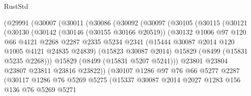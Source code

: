 \begin{lexlean}{RustStd}
\begin{coremodule}
                  (@29991
                    (@30007
                      (@30011
                        (@30086
                          (@30092
                            (@30097
                              (@30105
                                (@30115
                                  (@30121
                                    (@30130
                                      (@30142
                                        (@30146 (@30155 @30166 @20519))
                                        (@30132
                                          @1006
                                          @97
                                          @120
                                          @66
                                          @4121
                                          @2268
                                          @2287
                                          @2335
                                          @5234
                                          @2341
                                          (@15444 @30087 @2014 @120 @1005 @4121 @24835 @24839)
                                          (@15823 @30087 @2014)
                                          @15829
                                          (@8499 (@15831 @5235 @2268)))
                                        @15829
                                        (@8499 (@15831 @5207 @5241)))
                                      @23801
                                      @23804
                                      @23807
                                      @23811
                                      @23816
                                      @23822))
                                  (@30107
                                    @1286
                                    @97
                                    @76
                                    @66
                                    @5277
                                    @2287
                                    (@30117
                                      @1286
                                      @76
                                      @5269
                                      @5275
                                      (@15337
                                        @30087
                                        @2014
                                        @2027
                                        @1283
                                        @156
                                        @136
                                        @76
                                        @5269
                                        @5271

\end{coremodule}
\end{lexlean}
